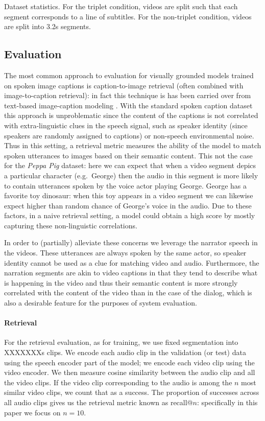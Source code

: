 \begin{table}
  \centering
  
  \caption{Dataset statistics. For the triplet condition, videos are
    split such that each segment corresponds to a line of
    subtitles. For the non-triplet condition, videos are split into
    3.2s segments.}
  \label{tab:ds-stat}
\end{table}


\subsection{Evaluation}
\label{sec:eval}
The most common approach to evaluation for visually grounded models
trained on spoken image captions is caption-to-image retrieval (often
combined with image-to-caption retrieval): in fact this technique is
has been carried over from text-based image-caption modeling
\citet{chrupala-visually-2021}.
 With the
standard spoken caption dataset this approach is unproblematic since
the content of the captions is not correlated with extra-linguistic
clues in the speech signal, such as speaker identity (since speakers
are randomly assigned to captions) or non-speech environmental
noise. Thus in this setting, a retrieval metric measures the ability of the
model to match spoken utterances to images based on their semantic
content. This not the case for the {\it Peppa Pig} dataset: here we
can expect that when a video segment depics a particular character
(e.g.\ George) then the audio in this segment is more likely to contain
utterances spoken by the voice actor playing George. George has a
favorite toy dinosaur: when this toy appears in a video segment we can
likewise expect higher than random chance of George's voice in the
audio. Due to these factors, in a naive retrieval setting, a model
could obtain a high score by mostly capturing these non-linguistic
correlations.

In order to (partially) alleviate these concerns we leverage the
narrator speech in the videos. These utterances are always spoken by
the same actor, so speaker identity cannot be used as a clue for
matching video and audio. Furthermore, the narration segments are akin
to video captions in that they tend to describe what is happening in
the video and thus their semantic content is more strongly
correlated with the content of the video than in the case of the
dialog, which is also a desirable feature for the purposes of system
evaluation.

\paragraph{Retrieval}
For the retrieval evaluation, as for training, we use fixed
segmentation into XXXXXXXs clips. We encode each audio clip in the
validation (or test) data using the speech encoder part of the model;
we encode each video clip using the video encoder. We then measure
cosine similarity between the audio clip and all the video clips. If
the video clip corresponding to the audio is among the $n$ most
similar video clips, we count that as a success. The proportion of
successes across all audio clips gives us the retrieval metric known
as recall@$n$: specifically in this paper we focus on $n=10$.

